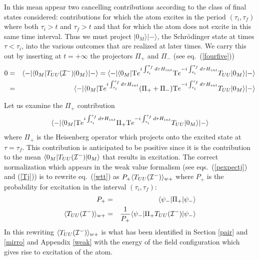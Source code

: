 \documentclass[12pt,oneside]{report}
\def\ket#1{|#1\rangle}
\def\bra#1{\langle #1|}
\def\elematrice#1#2#3{\langle #1|#2|#3 \rangle}
\begin{document}
In this mean appear two
cancelling contributions according to the class of final states
considered: contributions for which the atom excites in the period
$(\tau_i, \tau_f)$ where both $\tau_i >t$ and $\tau_f >t$ and that for
which the atom does not excite in this same time interval. Thus we must
project $\ket{0_M}\ket{-}$, the Schr\"odinger state at times $\tau< \tau_i$,
into the various outcomes that are realized at later times. We carry this out by inserting
 at $t=+\infty$ the
projectors $\Pi_+$ and $\Pi_-$ (see eq.~(\ref{fourfive})) \begin{eqnarray}
0 &=& \bra{-} \elematrice{0_M}{T_{UU}({\cal{I^-}})}{0_M}
\ket{-}
 = \bra{-} \elematrice{0_M}{ {\rm T}e^{i \int_{\tau_i}^{\tau_f} d \tau
H_{int} } {\rm T}e^{-i\int_{\tau_i}^{\tau_f} d \tau
H_{int} }T_{UU}}{0_M} \ket{-}\nonumber\\
 &=& \bra{-} \elematrice{0_M}{ {\rm T}e^{i \int_{\tau_i}^{\tau_f} d \tau
H_{int} } ( \Pi_+ + \Pi_-){\rm T} e^{-i\int_{\tau_i}^{\tau_f} d \tau
H_{int} }T_{UU}}{0_M} \ket{-} \label{wseven}
\end{eqnarray}



Let us examine the $\Pi_+$
contribution
\begin{eqnarray}
\bra{-} \elematrice{0_M}{{\rm T} e^{i \int_{\tau_i}^{\tau_f} d \tau
H_{int} }  \Pi_+ {\rm T}e^{-i\int_{\tau_i}^{\tau_f} d \tau
H_{int} }T_{UU}}{0_M} \ket{-}
\label{wtt}
\end{eqnarray}
where $\Pi_+$ is the Heisenberg operator which projects onto the excited
state at $\tau=\tau_f$. This contribution
is anticipated to be positive since it is the contribution to the mean
$\elematrice{0_M}{ T_{UU}({\cal{I^-}})}{0_M}$ that results in excitation. 
The correct normalization which appears in the weak value formalism 
(see eqs.~(\ref{pexpectj})  and (\ref{Tj})) is to
rewrite
eq.~(\ref{wtt}) 
 as $P_+ \langle T_{UU}({\cal{I^-}}) \rangle_{w+}$ where $P_+$ is 
the probability for excitation in the interval $(\tau_i,
\tau_f)$:
\begin{eqnarray}
P_+ &=&  
 \elematrice{\psi_-}{   \Pi_+ }{\psi_-}  \nonumber\\
\langle T_{UU}({\cal{I^-}}) \rangle_{w+} &=&  {1 \over P_+}
\bra{\psi_-}\Pi_+ T_{UU}({\cal{I^-}}) \ket{\psi_-}
\label{wts}
\end{eqnarray}
In this rewriting $\langle T_{UU} ({\cal{I^-}})\rangle_{w+}$  
is 
what
has been identified in Section \ref{pair} 
and \ref{mirro} and Appendix \ref{weak} 
with the energy of the field configuration which 
gives rise to excitation of the atom.
\end{document}
